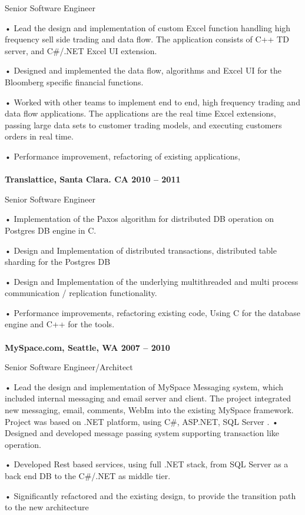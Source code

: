 Senior Software Engineer

    • Lead the design and implementation of custom Excel function handling high frequency sell side trading and data flow. The application consists of C++  TD server, and  C\#/.NET Excel UI extension.

    • Designed and implemented the data flow, algorithms and Excel UI for the Bloomberg specific financial functions.

    • Worked with other teams to implement end to end, high frequency trading and data flow applications. The applications are the real time Excel extensions, passing large data sets to customer trading models, and executing customers orders in real time.

    • Performance improvement, refactoring of existing applications, 
\\~\\
\textbf{Translattice, Santa Clara. CA		                          2010 – 2011}

Senior Software Engineer

    • Implementation of the Paxos algorithm for distributed DB operation on Postgres DB engine in C.

    • Design and Implementation of distributed transactions,  distributed table sharding for the Postgres DB

    • Design and Implementation of the underlying multithreaded and multi process communication / replication functionality.

    • Performance improvements, refactoring existing code, Using C for the database engine and C++ for the tools.
\\~\\
\textbf{MySpace.com, Seattle, WA								2007 – 2010}

Senior Software Engineer/Architect							

    • Lead the design and implementation of MySpace Messaging system, which included internal messaging and email server and client.  The project integrated new messaging, email, comments, WebIm into the existing MySpace framework. Project was based on .NET platform, using C\#, ASP.NET, SQL Server .
    • Designed and developed message passing system supporting transaction like operation.

    • Developed Rest based services, using full .NET stack, from SQL Server as a back end DB to the C\#/.NET as middle tier.

    • Significantly refactored and the existing design, to provide the transition path to the new architecture 

